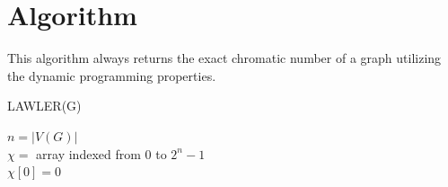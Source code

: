 \documentclass[14pt]{extreport}
\begin{document}
		\section{Algorithm}
		This algorithm always returns the exact chromatic number of a graph utilizing the dynamic programming properties.
		
		
		\begin{algorithm}[ht]
		    \ttfamily
		    \caption{LAWLER(G)}
            $n = |V(G)|$ \\
            $\chi = $ array indexed from $0$ to $2^n-1$ \\
            $\chi[0] = 0$ \\
    
		\end{algorithm}
		
		\pagebreak
		
\end{document}
